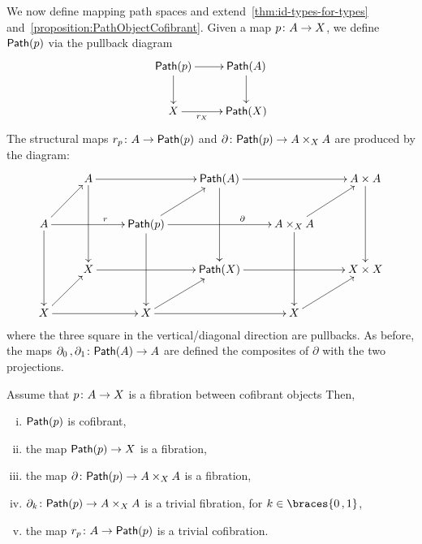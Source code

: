 \documentclass[reqno,10pt,a4paper,oneside,draft]{amsart}
\begin{document}








We now define mapping path spaces and  extend~\cref{thm:id-types-for-types} and~\cref{proposition:PathObjectCofibrant}. Given a map $p \colon A \to X$, we define $\mathsf{Path}(p)$ 
via the pullback diagram
\[
\xymatrix{
\Path(p) \ar[r] \ar[d] & \Path(A) \ar[d] \\
X \ar[r]_-{r_X} & \Path(X) }
\]
The structural maps $r_p \colon A \rightarrow \mathsf{Path}(p)$ and $\partial \colon \mathsf{Path}(p) \rightarrow A \times_{X} A$ are produced by the diagram:
\[
\xymatrix{
& A \ar[rr] \ar[dd] & & \Path(A) \ar[rr] \ar[dd] & & A \times A \ar[dd] \\
A \ar[ur] \ar[rr]^(.6){r}  \ar[dd] & & \Path(p) \ar[ur] \ar[rr]^(.65){\partial} \ar[dd] & & A \times_{X} A \ar[ur] \ar[dd] \\
& X \ar[rr] & & \Path(X) \ar[rr] & & X \times X \\
X \ar[ur] \ar[rr] & & X \ar[rr] \ar[ur] & & X \ar[ur] \\ 
}
\]
where the three square in the vertical/diagonal direction are pullbacks. As before, the maps
$\partial_0 \, , \partial_1 \colon \mathsf{Path}(A) \to A$ are defined the composites of $\partial$
with the two projections. 


\begin{theorem}
\label{thm:MainPathObject}
Assume that $p \colon A \rightarrow X $ is a fibration between cofibrant objects Then,
\begin{enumerate}[(i)] 
\item \label{thm:MainPathObject:IdBifib} $\mathsf{Path}(p)$ is cofibrant, 
\item the map $\mathsf{Path}(p) \rightarrow X$ is a fibration,
\item the map $\partial \colon \mathsf{Path}(p) \rightarrow A \times_{X} A$ is a fibration,
\item $\partial_k \colon \mathsf{Path}(p) \rightarrow A \times_{X} A$  is a trivial fibration, for $k \in \braces{0 \, , 1 }$,
\item the map $r_p \colon A \rightarrow \mathsf{Path}(p)$ is a trivial cofibration.
\end{enumerate}
\end{theorem}
\end{document}
